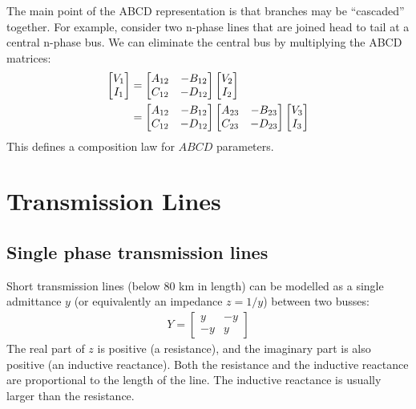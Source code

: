 \documentclass[11pt]{article}
\begin{document}
The main point of the ABCD representation is that branches may be ``cascaded'' together. For example, consider two n-phase lines that are joined head to tail at a central n-phase bus. We can eliminate the central bus by multiplying the ABCD matrices:
\begin{align}
	\begin{bmatrix}
		V_1 \\ I_1
	\end{bmatrix} &=
	\begin{bmatrix}
		A_{12} & -B_{12} \\ C_{12} & -D_{12}
	\end{bmatrix}
	\begin{bmatrix}
		V_2 \\ I_2
	\end{bmatrix} \notag \\
	&=
	\begin{bmatrix}
		A_{12} & -B_{12} \\ C_{12} & -D_{12}
	\end{bmatrix}
	\begin{bmatrix}
		A_{23} & -B_{23} \\ C_{23} & -D_{23}
	\end{bmatrix}
	\begin{bmatrix}
		V_3 \\ I_3
	\end{bmatrix}
\end{align}
This defines a composition law for $ABCD$ parameters.
\section{Transmission Lines}
\subsection{Single phase transmission lines}
Short transmission lines (below 80 km in length) can be modelled as a single admittance $y$ (or equivalently an impedance $z = 1/y$) between two busses:
\begin{align}
	Y = \begin{bmatrix}
		y & -y \\ -y & y
	\end{bmatrix}
\end{align}
The real part of $z$ is positive (a resistance), and the imaginary part is also positive (an inductive reactance). Both the resistance and the inductive reactance are proportional to the length of the line. The inductive reactance is usually larger than the resistance.
\end{document}
